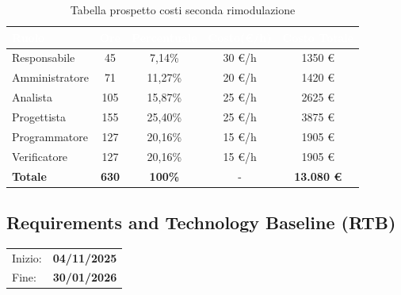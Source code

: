 \documentclass[a4paper, 11pt]{article}
\begin{document}
\begin{table}[H]
  \centering
  \begin{tabular}{|l|c|c|c|c|}
    \hline
    \cellcolor{AccentColor}\textbf{\textcolor{white}{Ruolo}} & 
    \cellcolor{AccentColor}\textbf{\textcolor{white}{Ore}} & 
    \cellcolor{AccentColor}\textbf{\textcolor{white}{Percentuale}} & 
    \cellcolor{AccentColor}\textbf{\textcolor{white}{Costo(€/h)}} & 
    \cellcolor{AccentColor}\textbf{\textcolor{white}{Costo Totale}} \\
    \hline
    
    Responsabile & 45 & 7,14\% & 30 €/h & 1350 € \\ \hline
    Amministratore & 71 & 11,27\% & 20 €/h & 1420 € \\ \hline
    Analista & 105 & 15,87\% & 25 €/h & 2625 € \\ \hline
    Progettista & 155 & 25,40\% & 25 €/h & 3875 € \\ \hline
    Programmatore & 127 & 20,16\% & 15 €/h & 1905 € \\ \hline
    Verificatore & 127 & 20,16\% & 15 €/h & 1905 € \\ \hline
    \textbf{Totale} & \textbf{630} & \textbf{100\%} & - & \textbf{13.080 €} \\ \hline
  \end{tabular}
  \caption{Tabella prospetto costi seconda rimodulazione}
\end{table}


\subsection{Requirements and Technology Baseline (RTB)}
\vspace{0.4cm}
\begin{tabular}{ll}
Inizio: & \textbf{04/11/2025} \\
Fine: & \textbf{30/01/2026} \\
\end{tabular}
\vspace{0.2cm}
\end{document}
